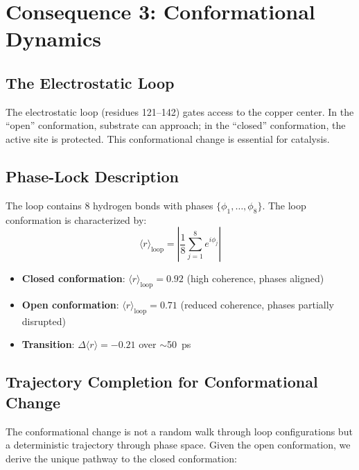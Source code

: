 \documentclass[twocolumn,aps,prx,superscriptaddress,longbibliography]{revtex4-2}
\theoremstyle{remark}
\newcommand{\orderpar}{\langle r \rangle}
\begin{document}
\section{Consequence 3: Conformational Dynamics}
\label{sec:conformational}

\subsection{The Electrostatic Loop}

The electrostatic loop (residues 121--142) gates access to the copper
center. In the ``open'' conformation, substrate can approach; in the
``closed'' conformation, the active site is protected. This conformational
change is essential for catalysis.

\subsection{Phase-Lock Description}

The loop contains 8 hydrogen bonds with phases $\{\phi_1, \ldots, \phi_8\}$.
The loop conformation is characterized by:
\begin{equation}
\orderpar_\text{loop} = \left| \frac{1}{8} \sum_{j=1}^{8} e^{i\phi_j} \right|
\label{eq:loop_order}
\end{equation}

\begin{itemize}
    \item \textbf{Closed conformation}: $\orderpar_\text{loop} = 0.92$
    (high coherence, phases aligned)

    \item \textbf{Open conformation}: $\orderpar_\text{loop} = 0.71$
    (reduced coherence, phases partially disrupted)

    \item \textbf{Transition}: $\Delta\orderpar = -0.21$ over $\sim$50~ps
\end{itemize}

\subsection{Trajectory Completion for Conformational Change}

The conformational change is not a random walk through loop configurations
but a deterministic trajectory through phase space. Given the open
conformation, we derive the unique pathway to the closed conformation:
\end{document}
